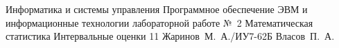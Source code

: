 \documentclass[a4paper,14pt, unknownkeysallowed]{extreport}
\begin{document}
\makereporttitle
{Информатика и системы управления} %
{Программное обеспечение ЭВМ и информационные технологии} %
{лабораторной работе №~2} %
{Математическая статистика} %
{Интервальные оценки} %
{11} %
{Жаринов~М.~А./ИУ7-62Б} %
{Власов~П.~А.} %
\setcounter{page}{2}

\end{document}
